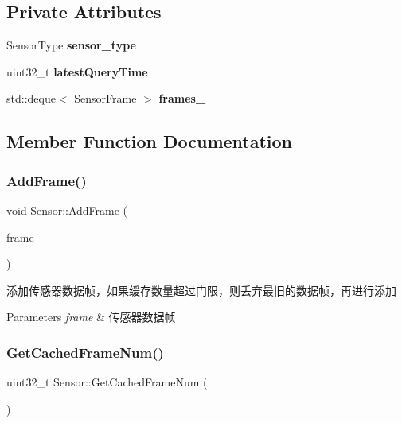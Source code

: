 \subsection*{Private Attributes}
\begin{DoxyCompactItemize}
\item 
\mbox{\label{classSensor_a9c1671ed427da9babf52278b6610d74b}} 
Sensor\+Type {\bfseries sensor\+\_\+type}
\item 
\mbox{\label{classSensor_a737b92548a3811468da39ee7462b207a}} 
uint32\+\_\+t {\bfseries latest\+Query\+Time}
\item 
\mbox{\label{classSensor_a01e9e80ad58eaf5c7df57a7504623f95}} 
std\+::deque$<$ Sensor\+Frame $>$ {\bfseries frames\+\_\+}
\end{DoxyCompactItemize}


\subsection{Member Function Documentation}
\mbox{\label{classSensor_a98f98f2b0a623cfdbf689b6d20e3f1b9}} 
\subsubsection{\texorpdfstring{Add\+Frame()}{AddFrame()}}
{\footnotesize\ttfamily void Sensor\+::\+Add\+Frame (\begin{DoxyParamCaption}\item[{const Sensor\+Frame \&}]{frame }\end{DoxyParamCaption})}



添加传感器数据帧，如果缓存数量超过门限，则丢弃最旧的数据帧，再进行添加 


\begin{DoxyParams}{Parameters}
{\em frame} & 传感器数据帧 \\
\hline
\end{DoxyParams}
\mbox{\label{classSensor_a22fe10838de17d20cf6e7969b51b1dec}} 
\subsubsection{\texorpdfstring{Get\+Cached\+Frame\+Num()}{GetCachedFrameNum()}}
{\footnotesize\ttfamily uint32\+\_\+t Sensor\+::\+Get\+Cached\+Frame\+Num (\begin{DoxyParamCaption}{ }\end{DoxyParamCaption})\hspace{0.3cm}{\ttfamily [inline]}}



